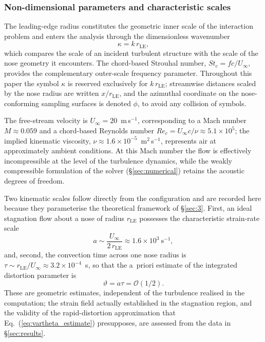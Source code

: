 \documentclass[lineno]{JFM-FLM_Au}
\begin{document}
\subsubsection{Non-dimensional parameters and characteristic scales}

The leading-edge radius constitutes the geometric inner scale of the
interaction problem and enters the analysis through the dimensionless
wavenumber
\begin{equation}
  \kappa = k\,r_{\mathrm{LE}},
  \label{eq:kappa_def}
\end{equation}
which compares the scale of an incident turbulent structure with the
scale of the nose geometry it encounters. The chord-based Strouhal
number, $St_c = fc/U_{\infty}$, provides the complementary outer-scale
frequency parameter. Throughout this paper the symbol $\kappa$ is
reserved exclusively for $k\,r_{\mathrm{LE}}$; streamwise distances
scaled by the nose radius are written $x/r_{\mathrm{LE}}$, and the
azimuthal coordinate on the nose-conforming sampling surfaces is denoted
$\phi$, to avoid any collision of symbols.

The free-stream velocity is $U_{\infty} = 20$~m\,s$^{-1}$, corresponding
to a Mach number $M \approx 0.059$ and a chord-based Reynolds number
$Re_c = U_{\infty}c/\nu \approx 5.1\times10^{5}$; the implied kinematic
viscosity, $\nu \approx 1.6\times10^{-5}$~m$^{2}$\,s$^{-1}$, represents
air at approximately ambient conditions. At this Mach number the flow is
effectively incompressible at the level of the turbulence dynamics,
while the weakly compressible formulation of the solver
(\S\ref{sec:numerical}) retains the acoustic degrees of freedom.

Two kinematic scales follow directly from the configuration and are
recorded here because they parameterise the theoretical framework of
\S\ref{sec:3}. First, an ideal stagnation flow about a nose of radius
$r_{\mathrm{LE}}$ possesses the characteristic strain-rate scale
\begin{equation}
  a \sim \frac{U_{\infty}}{2\,r_{\mathrm{LE}}}
    \approx 1.6\times10^{3}~\mathrm{s}^{-1},
  \label{eq:strain_scale}
\end{equation}
and, second, the convection time across one nose radius is
$\tau \sim r_{\mathrm{LE}}/U_{\infty} \approx 3.2\times10^{-4}$~s, so
that the a~priori estimate of the integrated distortion parameter is
\begin{equation}
  \vartheta = a\tau = \mathcal{O}(1/2).
  \label{eq:vartheta_estimate}
\end{equation}
These are geometric estimates, independent of the turbulence realised in
the computation; the strain field actually established in the stagnation
region, and the validity of the rapid-distortion approximation that
Eq.~(\ref{eq:vartheta_estimate}) presupposes, are assessed from the data
in \S\ref{sec:results}.
\end{document}
